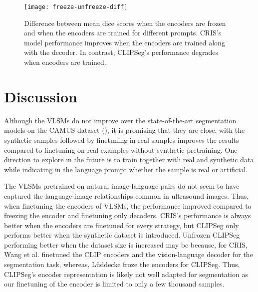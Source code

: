 \documentclass[runningheads]{llncs}
\begin{document}
\begin{figure}[h]
    \centering
    \texttt{[image: freeze-unfreeze-diff]}
    \caption{Difference between mean dice scores when the encoders are frozen and when the encoders are trained for different prompts.
    CRIS's model performance improves when the encoders are trained along with the decoder.
    In contrast, CLIPSeg's performance degrades when encoders are trained.
    }
    \label{fig:freeze-unfreeze-diff}
\end{figure}

\section{Discussion}
\label{sec:discussion}

Although the VLSMs do not improve over the state-of-the-art segmentation models on the CAMUS dataset (), it is promising that they are close.
 with the synthetic samples followed by finetuning in real samples improves the results compared to finetuning on real examples without synthetic pretraining. 
One  direction to explore in the future is to train together with real and synthetic data while indicating in the language prompt whether the sample is real or artificial.

The VLSMs pretrained on natural image-language pairs do not seem to have captured the language-image relationships common in ultrasound images.
Thus, when finetuning the encoders of VLSMs, the performance improved compared to freezing the encoder and finetuning only decoders.
CRIS's performance is always better when the encoders are finetuned for every strategy, but CLIPSeg only performs better when the synthetic dataset is introduced.
Unfrozen CLIPSeg performing better when the dataset size is increased may be because, for CRIS, Wang et al. \cite{wang2022cris} finetuned the CLIP encoders and the vision-language decoder for the segmentation task, whereas, 
L{\"u}ddecke  \cite{luddecke2022image} froze the encoders for CLIPSeg.
Thus, CLIPSeg's encoder representation is likely not well adapted for segmentation as our finetuning of the encoder is limited to only a few thousand samples. 
\end{document}
